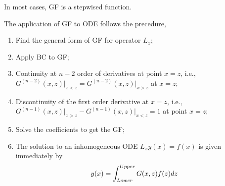 \documentclass[letterpaper,10pt,english]{sphinxmanual}
\begin{document}
In most cases, GF is a stepwised function.

The application of GF to ODE follows the precedure,
\begin{enumerate}
\item {} 
Find the general form of GF for operator \(L_x\);

\item {} 
Apply BC to GF;

\item {} 
Continuity at \(n-2\) order of derivatives at point \(x=z\), i.e., \(G^{(n-2)}(x,z)\vert_{x<z} = G^{(n-2)}(x,z)\vert_{x>z}\) at \(x=z\);

\item {} 
Discontinuity of the first order derivative at \(x=z\), i.e., \(G^{(n-1)}(x,z)\vert_{x>z} - G^{(n-1)}(x,z)\vert_{x<z} = 1\) at point \(x=z\);

\item {} 
Solve the coefficients to get the GF;

\item {} 
The solution to an inhomogeneous ODE \(L_x y(x) = f(x)\) is given immediately by
\begin{gather}
\begin{split}y(x) = \int_{Lower}^{Upper} G(x,z) f(z) dz\end{split}\notag
\end{gather}
\end{enumerate}
\end{document}
